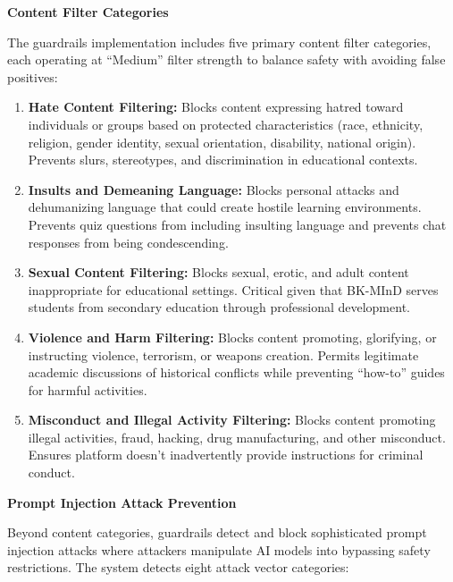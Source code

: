 \textbf{Content Filter Categories}

The guardrails implementation includes five primary content filter categories, each operating at ``Medium'' filter strength to balance safety with avoiding false positives:

\begin{enumerate}
    \item \textbf{Hate Content Filtering:} Blocks content expressing hatred toward individuals or groups based on protected characteristics (race, ethnicity, religion, gender identity, sexual orientation, disability, national origin). Prevents slurs, stereotypes, and discrimination in educational contexts.

    \item \textbf{Insults and Demeaning Language:} Blocks personal attacks and dehumanizing language that could create hostile learning environments. Prevents quiz questions from including insulting language and prevents chat responses from being condescending.

    \item \textbf{Sexual Content Filtering:} Blocks sexual, erotic, and adult content inappropriate for educational settings. Critical given that BK-MInD serves students from secondary education through professional development.

    \item \textbf{Violence and Harm Filtering:} Blocks content promoting, glorifying, or instructing violence, terrorism, or weapons creation. Permits legitimate academic discussions of historical conflicts while preventing ``how-to'' guides for harmful activities.

    \item \textbf{Misconduct and Illegal Activity Filtering:} Blocks content promoting illegal activities, fraud, hacking, drug manufacturing, and other misconduct. Ensures platform doesn't inadvertently provide instructions for criminal conduct.
\end{enumerate}

\textbf{Prompt Injection Attack Prevention}

Beyond content categories, guardrails detect and block sophisticated prompt injection attacks where attackers manipulate AI models into bypassing safety restrictions. The system detects eight attack vector categories:

